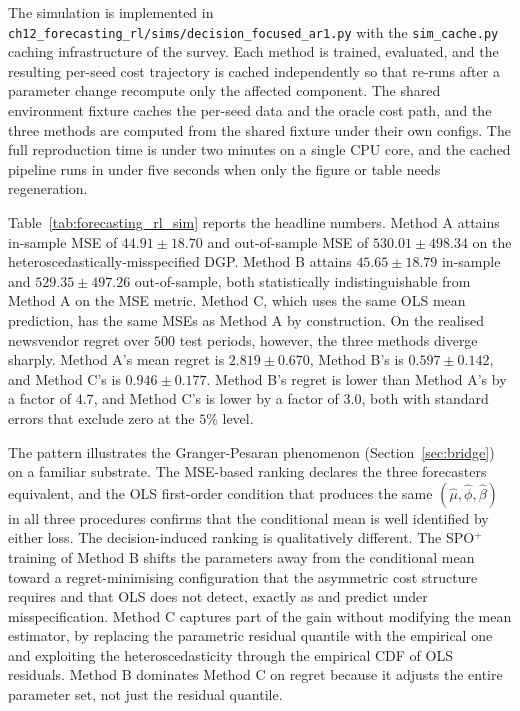 The simulation is implemented in
\verb|ch12_forecasting_rl/sims/decision_focused_ar1.py| with the
\verb|sim_cache.py| caching infrastructure of the survey. Each method is
trained, evaluated, and the resulting per-seed cost trajectory is cached
independently so that re-runs after a parameter change recompute only the
affected component. The shared environment fixture caches the per-seed
data and the oracle cost path, and the three methods are computed from
the shared fixture under their own configs. The full reproduction time is
under two minutes on a single CPU core, and the cached pipeline runs in
under five seconds when only the figure or table needs regeneration.

Table~\ref{tab:forecasting_rl_sim} reports the headline numbers. Method A
attains in-sample MSE of $44.91 \pm 18.70$ and out-of-sample MSE of
$530.01 \pm 498.34$ on the heteroscedastically-misspecified DGP. Method B
attains $45.65 \pm 18.79$ in-sample and $529.35 \pm 497.26$ out-of-sample,
both statistically indistinguishable from Method A on the MSE metric. Method
C, which uses the same OLS mean prediction, has the same MSEs as Method A by
construction. On the realised newsvendor regret over $500$ test periods,
however, the three methods diverge sharply. Method A's mean regret is
$2.819 \pm 0.670$, Method B's is $0.597 \pm 0.142$, and Method C's is
$0.946 \pm 0.177$. Method B's regret is lower than Method A's by a factor of
$4.7$, and Method C's is lower by a factor of $3.0$, both with standard
errors that exclude zero at the $5\%$ level.

The pattern illustrates the Granger-Pesaran phenomenon
(Section~\ref{sec:bridge}) on a familiar substrate. The MSE-based ranking
declares the three forecasters equivalent, and the OLS first-order condition
that produces the same $(\hat\mu, \hat\phi, \hat\beta)$ in all three
procedures confirms that the conditional mean is well identified by either
loss. The decision-induced ranking is qualitatively different. The SPO$^+$
training of Method B shifts the parameters away from the conditional mean
toward a regret-minimising configuration that the asymmetric cost structure
requires and that OLS does not detect, exactly as
\citet{ElmachtoubGrigas2022} and \citet{HuangGupta2024} predict under
misspecification. Method C captures part of the gain without modifying the
mean estimator, by replacing the parametric residual quantile with the
empirical one and exploiting the heteroscedasticity through the empirical
CDF of OLS residuals. Method B dominates Method C on regret because it
adjusts the entire parameter set, not just the residual quantile.

